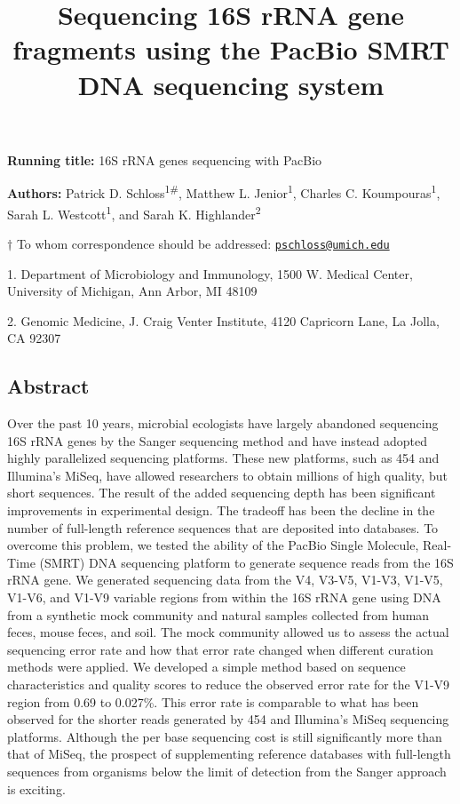 \documentclass[11pt,]{article}
\title{\textbf{Sequencing 16S rRNA gene fragments using the PacBio SMRT DNA
sequencing system}}
\author{}
\date{}
\begin{document}
\maketitle

\vspace{35mm}

\textbf{Running title:} 16S rRNA genes sequencing with PacBio

\vspace{15mm}

\textbf{Authors:} Patrick D. Schloss\textsuperscript{1\#}, Matthew L.
Jenior\textsuperscript{1}, Charles C. Koumpouras\textsuperscript{1},
Sarah L. Westcott\textsuperscript{1}, and Sarah K.
Highlander\textsuperscript{2}

\vspace{40mm}

\(\dagger\) To whom correspondence should be addressed:
\href{mailto:pschloss@umich.edu}{\nolinkurl{pschloss@umich.edu}}

1. Department of Microbiology and Immunology, 1500 W. Medical Center,
University of Michigan, Ann Arbor, MI 48109

2. Genomic Medicine, J. Craig Venter Institute, 4120 Capricorn Lane, La
Jolla, CA 92307

\newpage

\linenumbers

\subsection{Abstract}\label{abstract}

Over the past 10 years, microbial ecologists have largely abandoned
sequencing 16S rRNA genes by the Sanger sequencing method and have
instead adopted highly parallelized sequencing platforms. These new
platforms, such as 454 and Illumina's MiSeq, have allowed researchers to
obtain millions of high quality, but short sequences. The result of the
added sequencing depth has been significant improvements in experimental
design. The tradeoff has been the decline in the number of full-length
reference sequences that are deposited into databases. To overcome this
problem, we tested the ability of the PacBio Single Molecule, Real-Time
(SMRT) DNA sequencing platform to generate sequence reads from the 16S
rRNA gene. We generated sequencing data from the V4, V3-V5, V1-V3,
V1-V5, V1-V6, and V1-V9 variable regions from within the 16S rRNA gene
using DNA from a synthetic mock community and natural samples collected
from human feces, mouse feces, and soil. The mock community allowed us
to assess the actual sequencing error rate and how that error rate
changed when different curation methods were applied. We developed a
simple method based on sequence characteristics and quality scores to
reduce the observed error rate for the V1-V9 region from 0.69 to
0.027\%. This error rate is comparable to what has been observed for the
shorter reads generated by 454 and Illumina's MiSeq sequencing
platforms. Although the per base sequencing cost is still significantly
more than that of MiSeq, the prospect of supplementing reference
databases with full-length sequences from organisms below the limit of
detection from the Sanger approach is exciting.
\end{document}
